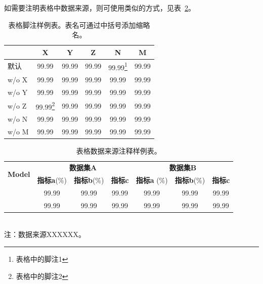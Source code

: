如需要注明表格中数据来源，则可使用类似的方式，见表~\ref{tab:example-table-source-foot}。

\begin{table}[htb]
    \centering
    \begin{minipage}[t]{0.55\linewidth} %
        \caption[表格脚注样例表]{表格脚注样例表。表名可通过中括号添加缩略名。}
        \label{tab:example-table-basic}
        \begin{small}
        \begin{tabular}{@{}lccccc@{}}
         \toprule[1.5pt]
         & \textbf{X} & \textbf{Y} & \textbf{Z} & \textbf{N} & \textbf{M} \\
         \midrule[1pt]
            默认        & 99.99 & 99.99 & 99.99 & 99.99\footnote{表格中的脚注1} & 99.99 \\
          \quad w/o X   & 99.99 & 99.99 & 99.99 & 99.99 & 99.99 \\
          \quad w/o Y   & 99.99 & 99.99 & 99.99 & 99.99 & 99.99 \\
          \quad w/o Z   & 99.99\footnote{表格中的脚注2} & 99.99 & 99.99 & 99.99 & 99.99 \\
          \quad w/o N   & 99.99 & 99.99 & 99.99 & 99.99 & 99.99 \\
          \quad w/o M   & 99.99 & 99.99 & 99.99 & 99.99 & 99.99 \\
          \bottomrule[1.5pt]
        \end{tabular}
        \end{small}
    \end{minipage}
\end{table}

\begin{table}[htbp]
   \centering
   \caption[数据来源注释表]{表格数据来源注释样例表。}
   \label{tab:example-table-source-foot}
   \begin{minipage}[t]{0.9\textwidth}
   \begin{small}
   \begin{tabular}{@{}l|ccc|ccc@{}}
   \toprule
   \multirow{2}{*}{\textbf{Model}} & \multicolumn{3}{c|}{\textbf{数据集A}} & \multicolumn{3}{c}{\textbf{数据集B}} \\ \cmidrule(l){2-7} 
    & \textbf{指标a}(\%) & \textbf{指标b}(\%) & \textbf{指标c} & \textbf{指标a} (\%) & \textbf{指标b}(\%) & \textbf{指标c} \\ \midrule
      \citet{devlin2018bert}      &99.99  & 99.99  & 99.99  &99.99  & 99.99  & 99.99  \\
      \citet{yang2019xlnet}      &99.99  & 99.99  & 99.99  &99.99  & 99.99  & 99.99  \\
    \bottomrule
   \end{tabular}\\[6pt]
   \footnotesize 注：数据来源XXXXXX。\\
   \end{small}
   \end{minipage}
\end{table}

